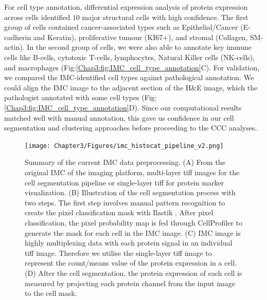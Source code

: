 For cell type annotation, differential expression analysis of protein expression across cells identified $10$ major structural cells with high confidence. The first group of cells contained cancer-associated types such as Epithelial/Cancer (E-cadherin and Keratin), proliferative tumour (KI67+), and stromal (Collagen, SM-actin). In the second group of cells, we were also able to annotate key immune cells like B-cells, cytotoxic T-cells, lymphocytes, Natural Killer cells (NK-cells), and macrophages (Fig:\ref{Chap3:fig:IMC_cell_type_annotation}C). For validation, we compared the IMC-identified cell types against pathological annotation. We could align the IMC image to the adjacent section of the H\&E image, which the pathologist annotated with some cell types (Fig:\ref{Chap3:fig:IMC_cell_type_annotation}D). Since our computational results matched well with manual annotation, this gave us confidence in our cell segmentation and clustering approaches before proceeding to the CCC analyses.

\begin{figure}[htp]
    \centering
    \texttt{[image: Chapter3/Figures/imc\_histocat\_pipeline\_v2.png]}
    \caption[Illustration of IMC data preprocessing.]{ Summary of the current IMC data preprocessing. (A) From the original IMC of the imaging platform, multi-layer tiff images for the cell segmentation pipeline or single-layer tiff for protein marker visualization. (B) Illustration of the cell segmentation process with two steps. The first step involves manual pattern recognition to create the pixel classification mask with Ilastik \cite{berg2019ilastik}. After pixel classification, the pixel probability map is fed through CellProfiler to generate the mask for each cell in the IMC image. (C) IMC image is highly multiplexing data with each protein signal in an individual tiff image. Therefore we utilise the single-layer tiff image to represent the count/means value of the protein expression in a cell. (D) After the cell segmentation, the protein expression of each cell is measured by projecting each protein channel from the input image to the cell mask.  }
    \label{Chap3:fig:IMC_data_preprocessing}
\end{figure}

